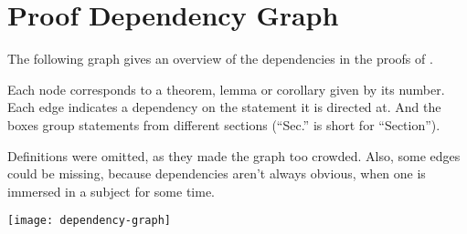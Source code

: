 \appendix
\section{Proof Dependency Graph}\label{sec:dependency-graph}

The following graph gives an overview of the dependencies in the proofs of \textcite{shitov2020sublinear}.

Each node corresponds to a theorem, lemma or corollary given by its number.
Each edge indicates a dependency on the statement it is directed at.
And the boxes group statements from different sections (``Sec.'' is short for ``Section'').

Definitions were omitted, as they made the graph too crowded.
Also, some edges could be missing, because dependencies aren't always obvious, when one is immersed in a subject for some time.

\newpage
\texttt{[image: dependency-graph]}
\newpage
